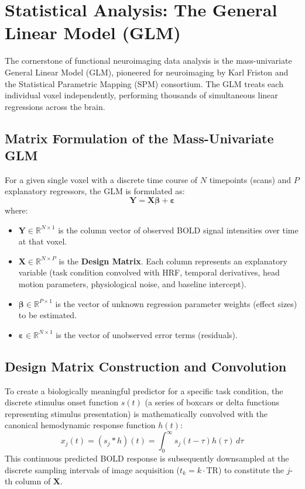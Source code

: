 \documentclass[11pt,a4paper]{article}
\begin{document}
\section{Statistical Analysis: The General Linear Model (GLM)}
The cornerstone of functional neuroimaging data analysis is the mass-univariate General Linear Model (GLM), pioneered for neuroimaging by Karl Friston and the Statistical Parametric Mapping (SPM) consortium. The GLM treats each individual voxel independently, performing thousands of simultaneous linear regressions across the brain.

\subsection{Matrix Formulation of the Mass-Univariate GLM}
For a given single voxel with a discrete time course of $N$ timepoints (scans) and $P$ explanatory regressors, the GLM is formulated as:
\begin{equation}
    \mathbf{Y} = \mathbf{X} \boldsymbol{\beta} + \boldsymbol{\varepsilon}
\end{equation}
where:
\begin{itemize}[leftmargin=2em]
    \item $\mathbf{Y} \in \mathbb{R}^{N \times 1}$ is the column vector of observed BOLD signal intensities over time at that voxel.
    \item $\mathbf{X} \in \mathbb{R}^{N \times P}$ is the \textbf{Design Matrix}. Each column represents an explanatory variable (task condition convolved with HRF, temporal derivatives, head motion parameters, physiological noise, and baseline intercept).
    \item $\boldsymbol{\beta} \in \mathbb{R}^{P \times 1}$ is the vector of unknown regression parameter weights (effect sizes) to be estimated.
    \item $\boldsymbol{\varepsilon} \in \mathbb{R}^{N \times 1}$ is the vector of unobserved error terms (residuals).
\end{itemize}

\subsection{Design Matrix Construction and Convolution}
To create a biologically meaningful predictor for a specific task condition, the discrete stimulus onset function $s(t)$ (a series of boxcars or delta functions representing stimulus presentation) is mathematically convolved with the canonical hemodynamic response function $h(t)$:
\begin{equation}
    x_j(t) = (s_j * h)(t) = \int_0^\infty s_j(t - \tau) h(\tau) \, d\tau
\end{equation}
This continuous predicted BOLD response is subsequently downsampled at the discrete sampling intervals of image acquisition ($t_k = k \cdot \text{TR}$) to constitute the $j$-th column of $\mathbf{X}$.
\end{document}
